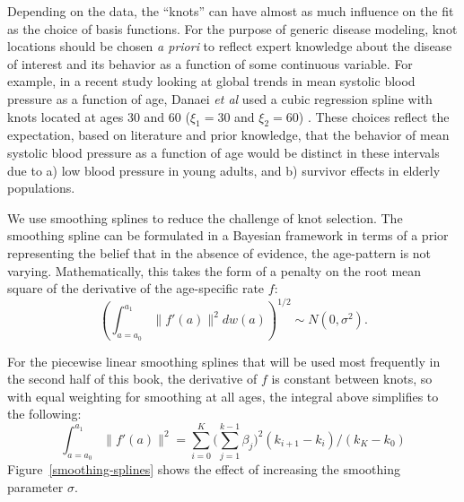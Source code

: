 \documentclass[12pt]{article}
\newcommand{\1}{\mathbf{1}}
\newcommand{\0}{\mathbf{0}}
\begin{document}
Depending on the data, the ``knots'' can have almost as much influence
on the fit as the choice of basis functions.  For the purpose of
generic disease modeling, knot locations should be chosen \emph{a
  priori} to reflect expert knowledge about the disease of interest
and its behavior as a function of some continuous variable. For
example, in a recent study looking at global trends in mean systolic
blood pressure as a function of age, Danaei \emph{et al} used a cubic
regression spline with knots located at ages 30 and 60 ($\xi_1 = 30$
and $\xi_2=60$) \cite{Danaei_National_2011}. These choices reflect the
expectation, based on literature and prior knowledge, that the
behavior of mean systolic blood pressure as a function of age would be
distinct in these intervals due to a) low blood pressure in young
adults, and b) survivor effects in elderly populations.

We use smoothing splines to reduce the challenge of knot selection.
The smoothing spline can be formulated in a Bayesian framework in
terms of a prior representing the belief that in the absence of
evidence, the age-pattern is not varying.  Mathematically, this takes
the form of a penalty on the root mean square of the derivative of the
age-specific rate $f$:
\[
\left(\int _{a=a_0} ^{a_1} \| f'(a) \|^2 dw(a)\right)^{1/2} \sim N(0, \sigma^2).
\]

For the piecewise linear smoothing splines that will be used most
frequently in the second half of this book, the derivative of $f$ is
constant between knots, so with equal weighting for smoothing at all
ages, the integral above simplifies to the following:
\[
\int _{a=a_0} ^{a_1} \| f'(a) \|^2 = \sum_{i=0} ^K \bigg(\sum_{j=1} ^{k-1} \beta_j\bigg)^2(k_{i+1}-k_i) / (k_K - k_0)
\]
Figure~\ref{smoothing-splines} shows the effect of increasing the
smoothing parameter $\sigma$.
\end{document}
